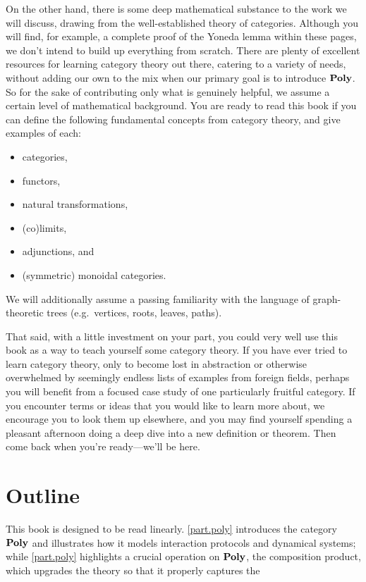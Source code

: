 \documentclass[Book-Poly]{subfiles}
\begin{document}
On the other hand, there is some deep mathematical substance to the work we will discuss, drawing from the well-established theory of categories.
Although you will find, for example, a complete proof of the Yoneda lemma within these pages, we don't intend to build up everything from scratch.
There are plenty of excellent resources for learning category theory out there, catering to a variety of needs, without adding our own to the mix when our primary goal is to introduce $\mathbf{Poly}$.
So for the sake of contributing only what is genuinely helpful, we assume a certain level of mathematical background.
You are ready to read this book if you can define the following fundamental concepts from category theory, and give examples of each:
\begin{itemize}
    \item categories,
    \item functors,
    \item natural transformations,
    \item (co)limits,
    \item adjunctions, and
    \item (symmetric) monoidal categories.
\end{itemize}
We will additionally assume a passing familiarity with the language of graph-theoretic trees (e.g.\ vertices, roots, leaves, paths).


That said, with a little investment on your part, you could very well use this book as a way to teach yourself some category theory.
If you have ever tried to learn category theory, only to become lost in abstraction or otherwise overwhelmed by seemingly endless lists of examples from foreign fields, perhaps you will benefit from a focused case study of one particularly fruitful category.
If you encounter terms or ideas that you would like to learn more about, we encourage you to look them up elsewhere, and you may find yourself spending a pleasant afternoon doing a deep dive into a new definition or theorem.
Then come back when you're ready---we'll be here.

\section*{Outline}

This book is designed to be read linearly.
\cref{part.poly} introduces the category $\mathbf{Poly}$ and illustrates how it models interaction protocols and dynamical systems; while \cref{part.poly} highlights a crucial operation on $\mathbf{Poly}$, the composition product, which upgrades the theory so that it properly captures the
\end{document}
